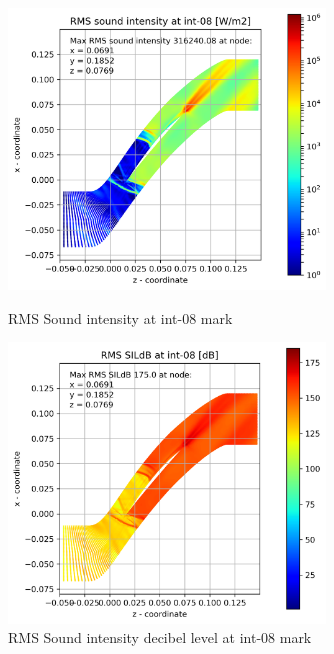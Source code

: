 \begin{figure}[ht]
  \centering
  \includegraphics[width=0.75\textwidth]{Figures/int-08-rms-sil.png}
  \caption{RMS Sound intensity at int-08 mark} \label{int-08-rms-sil}
  
  \vspace*{\floatsep}%

  \includegraphics[width=0.75\textwidth]{Figures/int-08-rms-sildb.png}
  \caption{RMS Sound intensity decibel level at int-08 mark} \label{int-08-rms-sildb}
\end{figure}


